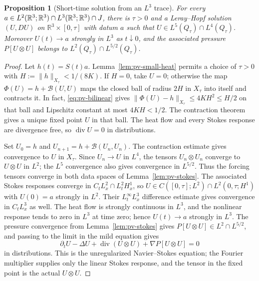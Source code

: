\documentclass[11pt,letterpaper]{article}
\numberwithin{equation}{section}
\theoremstyle{plain}
\newtheorem{proposition}[theorem]{Proposition}
\theoremstyle{definition}
\theoremstyle{remark}
\begin{document}
\begin{proposition}[Short-time solution from an $L^3$ trace]\label{prop:pv-local-solution}
For every $a\in L^2(\mathbb R^3;\mathbb R^3)\cap L^3(\mathbb R^3;\mathbb R^3)\cap J$, there is $\tau>0$ and a Leray--Hopf solution $(U,DU)$ on $\mathbb R^3\times[0,\tau]$ with datum $a$ such that $U\in L^5(Q_\tau)\cap L^4(Q_\tau)$. Moreover $U(t)\to a$ strongly in $L^3$ as $t\downarrow0$, and the associated pressure $P[U\otimes U]$ belongs to $L^2(Q_\tau)\cap L^{5/2}(Q_\tau)$.
\end{proposition}

\begin{proof}
Let $h(t)=S(t)a$. Lemma~\ref{lem:pv-small-heat} permits a choice of $\tau>0$ with $H:=\|h\|_{X_\tau}<1/(8K)$. If $H=0$, take $U=0$; otherwise the map $\Phi(U)=h+\mathcal B(U,U)$ maps the closed ball of radius $2H$ in $X_\tau$ into itself and contracts it. In fact, \eqref{eq:pv-bilinear} gives $\|\Phi(U)-h\|_{X_\tau}\le4KH^2\le H/2$ on that ball and Lipschitz constant at most $4KH<1/2$. The contraction theorem gives a unique fixed point $U$ in that ball. The heat flow and every Stokes response are divergence free, so $\operatorname{div}U=0$ in distributions.

Set $U_0=h$ and $U_{n+1}=h+\mathcal B(U_n,U_n)$. The contraction estimate gives convergence to $U$ in $X_\tau$. Since $U_n\to U$ in $L^4$, the tensors $U_n\otimes U_n$ converge to $U\otimes U$ in $L^2$; the $L^5$ convergence also gives convergence in $L^{5/2}$. Thus the forcing tensors converge in both data spaces of Lemma~\ref{lem:pv-stokes}. The associated Stokes responses converge in $C_tL^2_x\cap L^2_tH^1_x$, so $U\in C([0,\tau];L^2)\cap L^2(0,\tau;H^1)$ with $U(0)=a$ strongly in $L^2$. Their $L^\infty_tL^3_x$ difference estimate gives convergence in $C_tL^3_x$ as well. The heat flow is strongly continuous in $L^3$, and the nonlinear response tends to zero in $L^3$ at time zero; hence $U(t)\to a$ strongly in $L^3$. The pressure convergence from Lemma~\ref{lem:pv-stokes} gives $P[U\otimes U]\in L^2\cap L^{5/2}$, and passing to the limit in the mild equation gives
\begin{equation*}
\partial_tU-\Delta U+\operatorname{div}(U\otimes U)+\nabla P[U\otimes U]=0
\end{equation*}
in distributions. This is the unregularized Navier--Stokes equation; the Fourier multiplier supplies only the linear Stokes response, and the tensor in the fixed point is the actual $U\otimes U$.


\end{proof}
\end{document}
